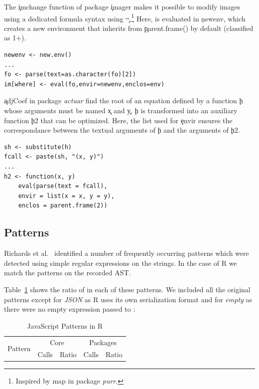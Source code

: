 \documentclass[conference]{IEEEtran}
\begin{document}
The \c{imchange} function of package \c{imager} makes it possible to modify
images using a dedicated formula syntax using \c{\~}.\footnote{Inspired by
 {map} in package \emph{purr}.}  Here, \eval is evaluated in \c{newenv},
which creates a new environment that inherits from \c{parent.frame()} by
default (classified as 1+).


\begin{lstlisting}
newenv <- new.env()
...
fo <- parse(text=as.character(fo)[2])
im[where] <- eval(fo,envir=newenv,enclos=env)
\end{lstlisting}

\c{adjCoef} in package \emph{actuar} find the root of an equation defined by
a function \c{h} whose arguments must be named \c{x} and \c{y}.  \c{h} is
transformed into an auxiliary function \c{h2} that can be optimized. Here,
the list used for \c{envir} ensures the correspondance between the textual
arguments of \c{h} and the arguments of \c{h2}.


\begin{lstlisting}
sh <- substitute(h)
fcall <- paste(sh, "(x, y)")
...
h2 <- function(x, y)
    eval(parse(text = fcall),
    envir = list(x = x, y = y),
    enclos = parent.frame(2))
\end{lstlisting}

\subsection{Patterns}

Richards et al.~\cite{ecoop11} identified a number of frequently occurring \eval
patterns which were detected using simple regular expressions on the \eval
strings. In the case of R we match the patterns on the recorded AST.

Table~\ref{table:js-pattens-in-r} shows the ratio of \eval in each of these
patterns. We included all the original patterns except for \emph{JSON} as R uses
its own serialization format and for \emph{empty} as there were no empty expression
passed to \eval:

\begin{table}[ht]%
  \centering
\begin{tabular}{r|r|r|r|r}\hline
\multirow{2}{*}{Pattern} & \multicolumn{2}{c|}{Core} & \multicolumn{2}{c}{Packages} \\
                         & Calls & Ratio            & Calls & Ratio \\\hline

\end{tabular}
\caption{JavaScript \eval Patterns in R}
\label{table:js-pattens-in-r}
\end{table}
\end{document}
